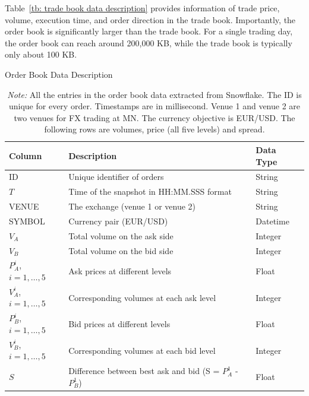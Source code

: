 Table~\ref{tb: trade book data description} provides information of trade price, volume, execution time, and order direction in the trade book. Importantly, the order book is significantly larger than the trade book. For a single trading day, the order book can reach around 200,000 KB, while the trade book is typically only about 100 KB.


\begin{table}[ht]
    \centering
    \caption{Order Book Data Description}
    \caption*{\textit{Note:} All the entries in the order book data extracted from Snowflake. The ID is unique for every order. Timestamps are in millisecond. Venue 1 and venue 2 are two venues for FX trading at MN. The currency objective is EUR/USD. The following rows are volumes, price (all five levels) and spread.}
    \begin{tabular}{lll}
        \toprule
        \textbf{Column} & \textbf{Description} & \textbf{Data Type} \\
        \midrule
        ID & Unique identifier of orders & String \\
        $T$ & Time of the snapshot in HH:MM.SSS format & String \\
        VENUE & The exchange (venue 1 or venue 2) & String \\
        SYMBOL & Currency pair (EUR/USD) & Datetime \\
        $V_A$ & Total volume on the ask side & Integer \\
        $V_B$ & Total volume on the bid side & Integer \\
        $P_A ^ {i}$, $i = 1, \dots, 5$ & Ask prices at different levels & Float \\
        $V_A ^ {i}$, $i = 1, \dots, 5$ & Corresponding volumes at each ask level & Integer \\
        $P_B ^ {i}$, $i = 1, \dots, 5$ & Bid prices at different levels & Float \\
        $V_B ^ {i}$, $i = 1, \dots, 5$ & Corresponding volumes at each bid level & Integer \\
        $S$ & Difference between best ask and bid (S = $P_A ^ {1}$ - $P_B ^ {1}$) & Float \\
        \bottomrule
    \end{tabular} 
    \label{tb: order book data description}
\end{table}

